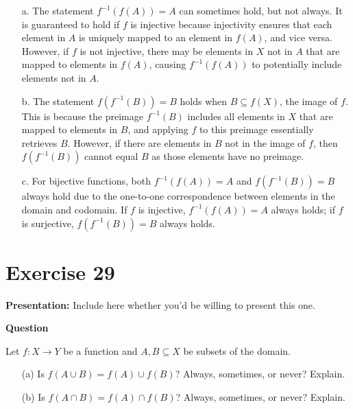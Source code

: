 \documentclass{article}
\begin{document}
\begin{enumerate}
    \item[a.]
The statement \( f^{-1}(f(A)) = A \) can sometimes hold, but not always. It is guaranteed to hold if \( f \) is injective because injectivity ensures that each element in \( A \) is uniquely mapped to an element in \( f(A) \), and vice versa. However, if \( f \) is not injective, there may be elements in \( X \) not in \( A \) that are mapped to elements in \( f(A) \), causing \( f^{-1}(f(A)) \) to potentially include elements not in \( A \).

\item[b.]
The statement \( f(f^{-1}(B)) = B \) holds when \( B \subseteq f(X) \), the image of \( f \). This is because the preimage \( f^{-1}(B) \) includes all elements in \( X \) that are mapped to elements in \( B \), and applying \( f \) to this preimage essentially retrieves \( B \). However, if there are elements in \( B \) not in the image of \( f \), then \( f(f^{-1}(B)) \) cannot equal \( B \) as those elements have no preimage.

\item[c.]
For bijective functions, both \( f^{-1}(f(A)) = A \) and \( f(f^{-1}(B)) = B \) always hold due to the one-to-one correspondence between elements in the domain and codomain. If \( f \) is injective, \( f^{-1}(f(A)) = A \) always holds; if \( f \) is surjective, \( f(f^{-1}(B)) = B \) always holds.
\end{enumerate}

\section*{Exercise 29}  

\noindent\textbf{Presentation:} Include here whether you'd be willing to present this one. 

\vspace{0.5cm} %

\noindent\textbf{Question}

Let \( f : X \to Y \) be a function and \( A, B \subseteq X \) be subsets of the domain.
\begin{enumerate}
    \item[(a)] Is \( f(A \cup B) = f(A) \cup f(B) \)? Always, sometimes, or never? Explain.
    \item[(b)] Is \( f(A \cap B) = f(A) \cap f(B) \)? Always, sometimes, or never? Explain.
\end{enumerate}
\end{document}
